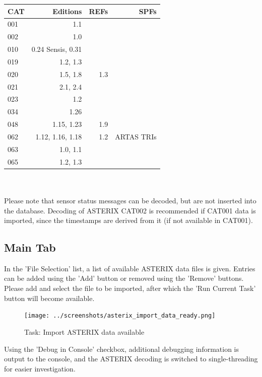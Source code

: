 \begin{tabular}{ | l | r | r | r |}
\hline
  CAT & Editions & REFs & SPFs  \\ \hline
  001 & 1.1 &  &  \\ \hline
  002 & 1.0 &  &  \\ \hline
  010 & 0.24 Sensis, 0.31  &  &  \\ \hline
  019 & 1.2, 1.3 & & \\ \hline
  020 & 1.5, 1.8 & 1.3 & \\ \hline
  021 & 2.1, 2.4 & & \\ \hline
  023 & 1.2 & & \\ \hline
  034 & 1.26 & & \\ \hline
  048 & 1.15, 1.23 & 1.9 & \\ \hline
  062 & 1.12, 1.16, 1.18 & 1.2 & ARTAS TRIs \\ \hline
  063 & 1.0, 1.1 & & \\ \hline
  065 & 1.2, 1.3 & & \\ \hline
\end{tabular} \\
\  \\

Please note that sensor status messages can be decoded, but are not inserted into the database. Decoding of ASTERIX CAT002 is recommended if CAT001 data is imported, since the timestamps are derived from it (if not available in CAT001).

\subsection{Main Tab}

In the 'File Selection' list, a list of available ASTERIX data files is given. Entries can be added using the 'Add' button or removed using the 'Remove' buttons. \\

Please add and select the file to be imported, after which the 'Run Current Task' button will become available. \\

\begin{figure}[H]
  \hspace*{-2.5cm}
    \texttt{[image: ../screenshots/asterix\_import\_data\_ready.png]}
  \caption{Task: Import ASTERIX data available}
\end{figure}

Using the 'Debug in Console' checkbox, additional debugging information is output to the console, and the ASTERIX decoding is switched to single-threading for easier investigation. \\

